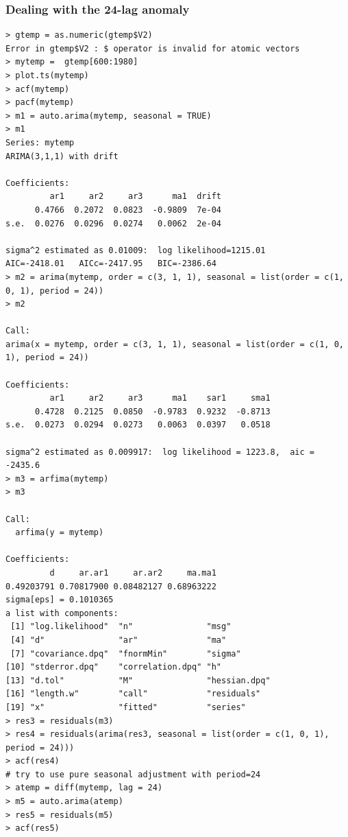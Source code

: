 \documentclass[a4paper,10pt]{article}
\begin{document}
\subsubsection{Dealing with the 24-lag anomaly}
\begin{verbatim}
> gtemp = as.numeric(gtemp$V2)
Error in gtemp$V2 : $ operator is invalid for atomic vectors
> mytemp =  gtemp[600:1980] 
> plot.ts(mytemp)
> acf(mytemp)
> pacf(mytemp)
> m1 = auto.arima(mytemp, seasonal = TRUE)
> m1
Series: mytemp 
ARIMA(3,1,1) with drift         

Coefficients:
         ar1     ar2     ar3      ma1  drift
      0.4766  0.2072  0.0823  -0.9809  7e-04
s.e.  0.0276  0.0296  0.0274   0.0062  2e-04

sigma^2 estimated as 0.01009:  log likelihood=1215.01
AIC=-2418.01   AICc=-2417.95   BIC=-2386.64
> m2 = arima(mytemp, order = c(3, 1, 1), seasonal = list(order = c(1, 0, 1), period = 24))
> m2

Call:
arima(x = mytemp, order = c(3, 1, 1), seasonal = list(order = c(1, 0, 1), period = 24))

Coefficients:
         ar1     ar2     ar3      ma1    sar1     sma1
      0.4728  0.2125  0.0850  -0.9783  0.9232  -0.8713
s.e.  0.0273  0.0294  0.0273   0.0063  0.0397   0.0518

sigma^2 estimated as 0.009917:  log likelihood = 1223.8,  aic = -2435.6
> m3 = arfima(mytemp)
> m3

Call:
  arfima(y = mytemp) 

Coefficients:
         d     ar.ar1     ar.ar2     ma.ma1 
0.49203791 0.70817900 0.08482127 0.68963222 
sigma[eps] = 0.1010365 
a list with components:
 [1] "log.likelihood"  "n"               "msg"            
 [4] "d"               "ar"              "ma"             
 [7] "covariance.dpq"  "fnormMin"        "sigma"          
[10] "stderror.dpq"    "correlation.dpq" "h"              
[13] "d.tol"           "M"               "hessian.dpq"    
[16] "length.w"        "call"            "residuals"      
[19] "x"               "fitted"          "series"  
> res3 = residuals(m3)
> res4 = residuals(arima(res3, seasonal = list(order = c(1, 0, 1), period = 24)))
> acf(res4) 
# try to use pure seasonal adjustment with period=24
> atemp = diff(mytemp, lag = 24)
> m5 = auto.arima(atemp)
> res5 = residuals(m5)
> acf(res5)
\end{verbatim}
\end{document}
